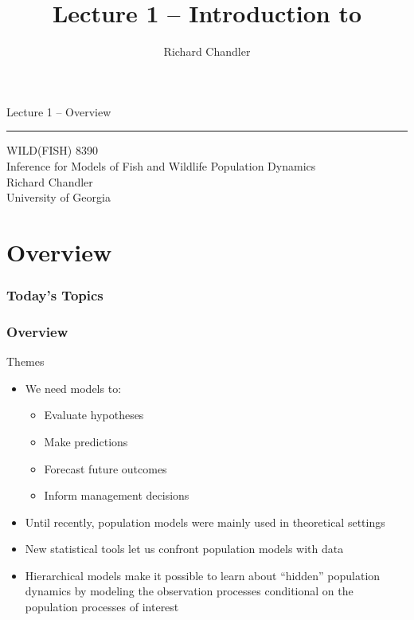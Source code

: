\documentclass[color=usenames,dvipsnames]{beamer}\usepackage[]{graphicx}\usepackage[]{xcolor}
\title{Lecture 1 -- Introduction to }
\author{Richard Chandler}
\begin{document}
\begin{frame}[plain]
  \LARGE
  \centering
  {\huge %
    Lecture 1 -- Overview} \\
  {\color{default} \rule{\textwidth}{0.1pt}}
  \vfill
  \large
  WILD(FISH) 8390 \\
  Inference for Models of Fish and Wildlife Population Dynamics \\
  \vfill
  Richard Chandler \\
  University of Georgia
\end{frame}



\section{Overview}


\begin{frame}[plain]
  \frametitle{Today's Topics}
  \Large
\end{frame}



\begin{frame}[fragile]
  \frametitle{Overview}
  {\Large Themes}
  \begin{itemize}
    \item<1-> We need models to:
      \begin{itemize}[<1->]
        \item Evaluate hypotheses
        \item Make predictions
        \item Forecast future outcomes
        \item Inform management decisions
      \end{itemize}
    \item<2-> Until recently, population models were mainly used in theoretical settings
    \item<3-> New statistical tools let us confront population models with data
    \item<4-> Hierarchical models make it possible to learn about
      ``hidden'' population dynamics by modeling the observation
      processes conditional on the population processes of interest
  \end{itemize}
\end{frame}
\end{document}
